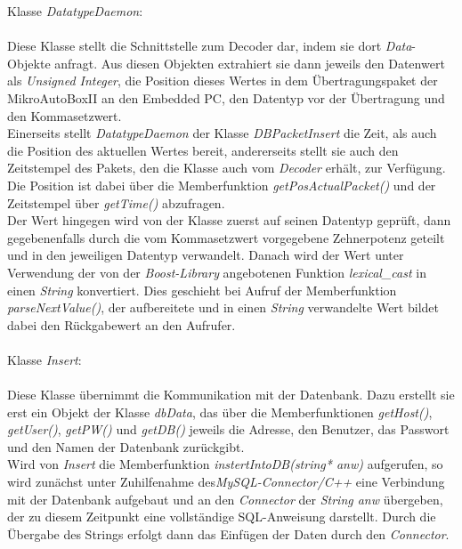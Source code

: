 \documentclass[fontsize = 12pt, paper = a4]{scrreprt}
\begin{document}
Klasse \textit{DatatypeDaemon}:\\ \\
Diese Klasse stellt die Schnittstelle zum Decoder dar, indem sie dort \textit{Data}-Objekte anfragt. Aus diesen Objekten extrahiert sie dann jeweils den Datenwert als \textit{Unsigned Integer}, die Position dieses Wertes in dem Übertragungspaket der MikroAutoBoxII an den Embedded PC, den Datentyp vor der Übertragung und den Kommasetzwert.\\
Einerseits stellt \textit{DatatypeDaemon} der Klasse \textit{DBPacketInsert} die Zeit, als auch die Position des aktuellen Wertes bereit, andererseits stellt sie auch den Zeitstempel des Pakets, den die Klasse auch vom \textit{Decoder} erhält, zur Verfügung. Die Position ist dabei über die Memberfunktion \textit{getPosActualPacket()} und der Zeitstempel über \textit{getTime()} abzufragen.\\
Der Wert hingegen wird von der Klasse zuerst auf seinen Datentyp geprüft, dann gegebenenfalls durch die vom Kommasetzwert vorgegebene Zehnerpotenz geteilt und in den jeweiligen Datentyp verwandelt. Danach wird der Wert unter Verwendung der von der \textit{Boost-Library} angebotenen Funktion \textit{lexical\_cast} in einen \textit{String} konvertiert. Dies geschieht bei Aufruf der Memberfunktion \textit{parseNextValue()}, der aufbereitete und in einen \textit{String} verwandelte Wert bildet dabei den Rückgabewert an den Aufrufer.\\
\\
Klasse \textit{Insert}:\\ \\
Diese Klasse übernimmt die Kommunikation mit der Datenbank. Dazu erstellt sie erst ein Objekt der Klasse \textit{dbData}, das über die Memberfunktionen \textit{getHost()}, \textit{getUser()}, \textit{getPW()} und \textit{getDB()} jeweils die Adresse, den Benutzer, das Passwort und den Namen der Datenbank zurückgibt.\\
Wird von \textit{Insert} die Memberfunktion \textit{instertIntoDB(string* anw)} aufgerufen, so wird zunächst unter Zuhilfenahme des\textit{MySQL-Connector/C++} eine Verbindung mit der Datenbank aufgebaut und an den \textit{Connector} der \textit{String anw} übergeben, der zu diesem Zeitpunkt eine vollständige SQL-Anweisung darstellt. Durch die Übergabe des Strings erfolgt dann das Einfügen der Daten durch den \textit{Connector}.
\end{document}
